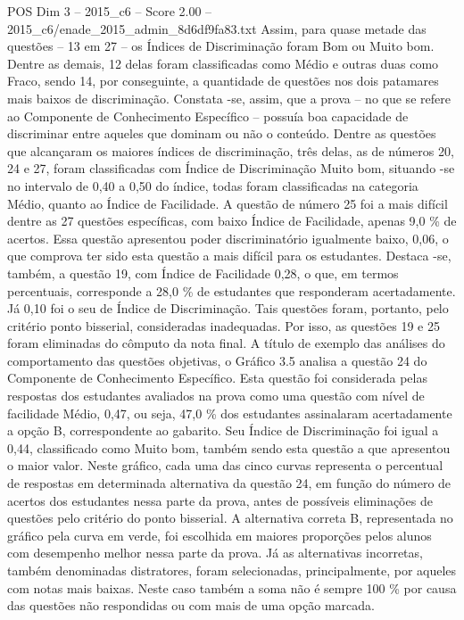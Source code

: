 \begin{textsample}{POS Dim 3 – 2015\_c6 – Score 2.00 – 2015\_c6/enade\_2015\_admin\_8d6df9fa83.txt}
Assim, para quase metade das questões – 13 em 27 – os Índices de Discriminação foram Bom ou Muito bom.
Dentre as demais, 12 delas foram classificadas como Médio e outras duas como Fraco, sendo 14, por conseguinte, a quantidade de questões nos dois patamares mais baixos de discriminação.
Constata -se, assim, que a prova – no que se refere ao Componente de Conhecimento Específico – possuía boa capacidade de discriminar entre aqueles que dominam ou não o conteúdo.
Dentre as questões que alcançaram os maiores índices de discriminação, três delas, as de números 20, 24 e 27, foram classificadas com Índice de Discriminação Muito bom, situando -se no intervalo de 0,40 a 0,50 do índice, todas foram classificadas na categoria Médio, quanto ao Índice de Facilidade.
A questão de número 25 foi a mais difícil dentre as 27 questões específicas, com baixo Índice de Facilidade, apenas 9,0 \% de acertos.
Essa questão apresentou poder discriminatório igualmente baixo, 0,06, o que comprova ter sido esta questão a mais difícil para os estudantes.
Destaca -se, também, a questão 19, com Índice de Facilidade 0,28, o que, em termos percentuais, corresponde a 28,0 \% de estudantes que responderam acertadamente.
Já 0,10 foi o seu de Índice de Discriminação.
Tais questões foram, portanto, pelo critério ponto bisserial, consideradas inadequadas.
Por isso, as questões 19 e 25 foram eliminadas do cômputo da nota final.
A título de exemplo das análises do comportamento das questões objetivas, o Gráfico 3.5 analisa a questão 24 do Componente de Conhecimento Específico.
Esta questão foi considerada pelas respostas dos estudantes avaliados na prova como uma questão com nível de facilidade Médio, 0,47, ou seja, 47,0 \% dos estudantes assinalaram acertadamente a opção B, correspondente ao gabarito.
Seu Índice de Discriminação foi igual a 0,44, classificado como Muito bom, também sendo esta questão a que apresentou o maior valor.
Neste gráfico, cada uma das cinco curvas representa o percentual de respostas em determinada alternativa da questão 24, em função do número de acertos dos estudantes nessa parte da prova, antes de possíveis eliminações de questões pelo critério do ponto bisserial.
A alternativa correta B, representada no gráfico pela curva em verde, foi escolhida em maiores proporções pelos alunos com desempenho melhor nessa parte da prova.
Já as alternativas incorretas, também denominadas distratores, foram selecionadas, principalmente, por aqueles com notas mais baixas.
Neste caso também a soma não é sempre 100 \% por causa das questões não respondidas ou com mais de uma opção marcada.

\end{textsample}
